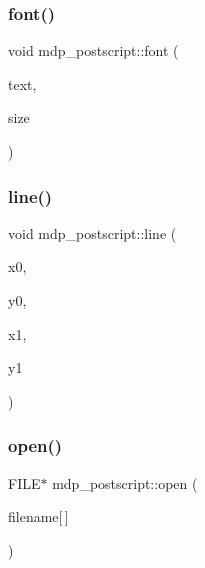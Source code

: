 \mbox{\label{classmdp__postscript_a296dff78ebec7c38e3c39d97d3743172}} 
\subsubsection{\texorpdfstring{font()}{font()}}
{\footnotesize\ttfamily void mdp\+\_\+postscript\+::font (\begin{DoxyParamCaption}\item[{const char $\ast$}]{text,  }\item[{int}]{size }\end{DoxyParamCaption})\hspace{0.3cm}{\ttfamily [inline]}}

\mbox{\label{classmdp__postscript_a99a00f3641062e5beef501f07baa7785}} 
\subsubsection{\texorpdfstring{line()}{line()}}
{\footnotesize\ttfamily void mdp\+\_\+postscript\+::line (\begin{DoxyParamCaption}\item[{float}]{x0,  }\item[{float}]{y0,  }\item[{float}]{x1,  }\item[{float}]{y1 }\end{DoxyParamCaption})\hspace{0.3cm}{\ttfamily [inline]}}

\mbox{\label{classmdp__postscript_a2c2ab911f52c386532b769dda793dcdc}} 
\subsubsection{\texorpdfstring{open()}{open()}}
{\footnotesize\ttfamily F\+I\+LE$\ast$ mdp\+\_\+postscript\+::open (\begin{DoxyParamCaption}\item[{char}]{filename\mbox{[}$\,$\mbox{]} }\end{DoxyParamCaption})\hspace{0.3cm}{\ttfamily [inline]}}


